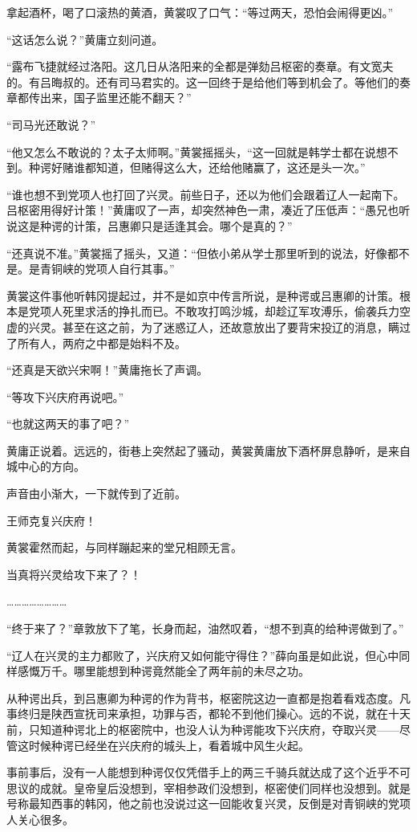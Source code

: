 拿起酒杯，喝了口滚热的黄酒，黄裳叹了口气：“等过两天，恐怕会闹得更凶。”

“这话怎么说？”黄庸立刻问道。

“露布飞捷就经过洛阳。这几日从洛阳来的全都是弹劾吕枢密的奏章。有文宽夫的。有吕晦叔的。还有司马君实的。这一回终于是给他们等到机会了。等他们的奏章都传出来，国子监里还能不翻天？”

“司马光还敢说？”

“他又怎么不敢说的？太子太师啊。”黄裳摇摇头，“这一回就是韩学士都在说想不到。种谔好赌谁都知道，但赌得这么大，还给他赌赢了，这还是头一次。”

“谁也想不到党项人也打回了兴灵。前些日子，还以为他们会跟着辽人一起南下。吕枢密用得好计策！”黄庸叹了一声，却突然神色一肃，凑近了压低声：“愚兄也听说这是种谔的计策，吕惠卿只是适逢其会。哪个是真的？”

“还真说不准。”黄裳摇了摇头，又道：“但依小弟从学士那里听到的说法，好像都不是。是青铜峡的党项人自行其事。”

黄裳这件事他听韩冈提起过，并不是如京中传言所说，是种谔或吕惠卿的计策。根本是党项人死里求活的挣扎而已。不敢攻打鸣沙城，却趁辽军攻溥乐，偷袭兵力空虚的兴灵。甚至在这之前，为了迷惑辽人，还故意放出了要背宋投辽的消息，瞒过了所有人，两府之中都是始料不及。

“还真是天欲兴宋啊！”黄庸拖长了声调。

“等攻下兴庆府再说吧。”

“也就这两天的事了吧？”

黄庸正说着。远远的，街巷上突然起了骚动，黄裳黄庸放下酒杯屏息静听，是来自城中心的方向。

声音由小渐大，一下就传到了近前。

王师克复兴庆府！

黄裳霍然而起，与同样蹦起来的堂兄相顾无言。

当真将兴灵给攻下来了？！

……………………

“终于来了？”章敦放下了笔，长身而起，油然叹着，“想不到真的给种谔做到了。”

“辽人在兴灵的主力都败了，兴庆府又如何能守得住？”薛向虽是如此说，但心中同样感慨万千。哪里能想到种谔竟然能全了两年前的未尽之功。

从种谔出兵，到吕惠卿为种谔的作为背书，枢密院这边一直都是抱着看戏态度。凡事终归是陕西宣抚司来承担，功罪与否，都轮不到他们操心。远的不说，就在十天前，只知道种谔北上的枢密院中，也没人认为种谔能攻下兴庆府，夺取兴灵——尽管这时候种谔已经坐在兴庆府的城头上，看着城中风生火起。

事前事后，没有一人能想到种谔仅仅凭借手上的两三千骑兵就达成了这个近乎不可思议的成就。皇帝皇后没想到，宰相参政们没想到，枢密使们同样也没想到。就是号称最知西事的韩冈，他之前也没说过这一回能收复兴灵，反倒是对青铜峡的党项人关心很多。

